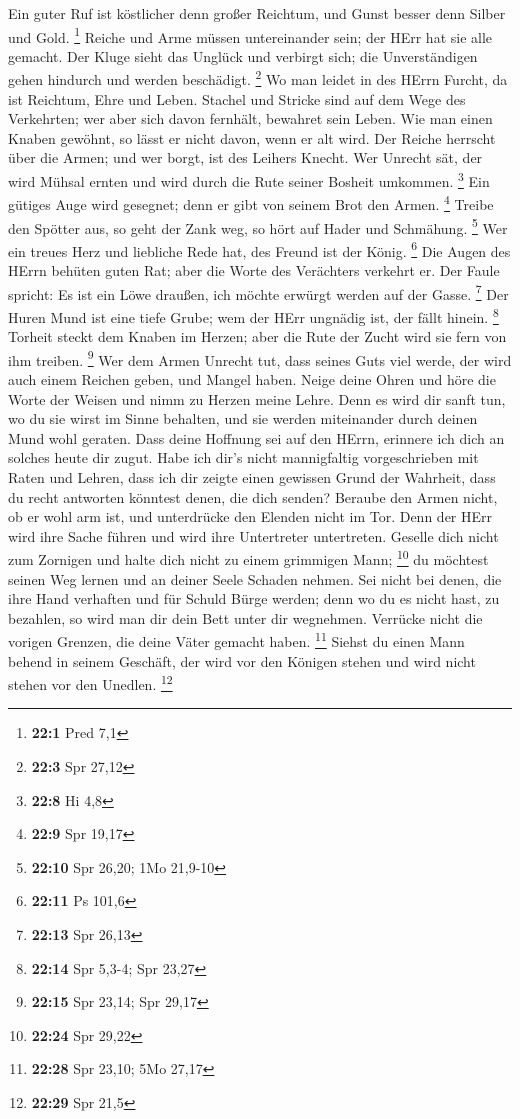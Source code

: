  Ein guter Ruf ist köstlicher denn großer Reichtum, und
Gunst besser denn Silber und Gold. \footnote{\textbf{22:1} Pred 7,1}
 Reiche und Arme müssen untereinander sein; der HErr hat sie
alle gemacht.  Der Kluge sieht das Unglück und verbirgt
sich; die Unverständigen gehen hindurch und werden beschädigt.
\footnote{\textbf{22:3} Spr 27,12}  Wo man leidet in des
HErrn Furcht, da ist Reichtum, Ehre und Leben.  Stachel und
Stricke sind auf dem Wege des Verkehrten; wer aber sich davon fernhält,
bewahret sein Leben.  Wie man einen Knaben gewöhnt, so lässt
er nicht davon, wenn er alt wird.  Der Reiche herrscht über
die Armen; und wer borgt, ist des Leihers Knecht.  Wer
Unrecht sät, der wird Mühsal ernten und wird durch die Rute seiner
Bosheit umkommen. \footnote{\textbf{22:8} Hi 4,8}  Ein
gütiges Auge wird gesegnet; denn er gibt von seinem Brot den Armen.
\footnote{\textbf{22:9} Spr 19,17}  Treibe den Spötter aus,
so geht der Zank weg, so hört auf Hader und Schmähung. \footnote{\textbf{22:10}
  Spr 26,20; 1Mo 21,9-10}  Wer ein treues Herz und
liebliche Rede hat, des Freund ist der König. \footnote{\textbf{22:11}
  Ps 101,6}  Die Augen des HErrn behüten guten Rat; aber
die Worte des Verächters verkehrt er.  Der Faule spricht:
Es ist ein Löwe draußen, ich möchte erwürgt werden auf der Gasse.
\footnote{\textbf{22:13} Spr 26,13}  Der Huren Mund ist
eine tiefe Grube; wem der HErr ungnädig ist, der fällt hinein.
\footnote{\textbf{22:14} Spr 5,3-4; Spr 23,27}  Torheit
steckt dem Knaben im Herzen; aber die Rute der Zucht wird sie fern von
ihm treiben. \footnote{\textbf{22:15} Spr 23,14; Spr 29,17}
 Wer dem Armen Unrecht tut, dass seines Guts viel werde,
der wird auch einem Reichen geben, und Mangel haben.  Neige
deine Ohren und höre die Worte der Weisen und nimm zu Herzen meine
Lehre.  Denn es wird dir sanft tun, wo du sie wirst im
Sinne behalten, und sie werden miteinander durch deinen Mund wohl
geraten.  Dass deine Hoffnung sei auf den HErrn, erinnere
ich dich an solches heute dir zugut.  Habe ich dir's nicht
mannigfaltig vorgeschrieben mit Raten und Lehren,  dass ich
dir zeigte einen gewissen Grund der Wahrheit, dass du recht antworten
könntest denen, die dich senden?  Beraube den Armen nicht,
ob er wohl arm ist, und unterdrücke den Elenden nicht im Tor.
 Denn der HErr wird ihre Sache führen und wird ihre
Untertreter untertreten.  Geselle dich nicht zum Zornigen
und halte dich nicht zu einem grimmigen Mann; \footnote{\textbf{22:24}
  Spr 29,22}  du möchtest seinen Weg lernen und an deiner
Seele Schaden nehmen.  Sei nicht bei denen, die ihre Hand
verhaften und für Schuld Bürge werden;  denn wo du es nicht
hast, zu bezahlen, so wird man dir dein Bett unter dir wegnehmen.
 Verrücke nicht die vorigen Grenzen, die deine Väter
gemacht haben. \footnote{\textbf{22:28} Spr 23,10; 5Mo 27,17}
 Siehst du einen Mann behend in seinem Geschäft, der wird
vor den Königen stehen und wird nicht stehen vor den Unedlen.
\footnote{\textbf{22:29} Spr 21,5}

